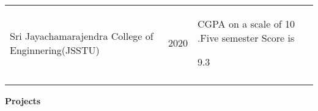 \documentclass[12pt]{article}
\begin{document}
\begin{table}[H]
\begin{tabular}{p{1.37in}p{1.37in}p{1.37in}p{1.38in}}
\multicolumn{1}{|p{1.37in}}{\begin{Center}Sri Jayachamarajendra College of Enginnering(JSSTU)\end{Center}} & 
\multicolumn{1}{|p{1.37in}}{\begin{Center}2020\end{Center}} & 
\multicolumn{1}{|p{1.38in}|}{\begin{Center}CGPA on a scale of 10 .Five semester Score is\end{Center} \begin{Center}\par 9.3 \end{Center}\par } \\
\hhline{----}

\end{tabular}
 \end{table}
 
 
\vspace{0.1cm}
{\fontsize{14pt}{16.8pt}\selectfont \textbf{Projects}\par}\par
\end{document}
